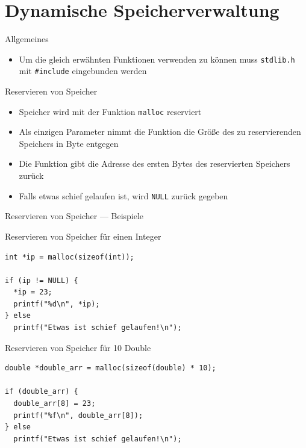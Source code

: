 \documentclass[presentation]{beamer}
\begin{document}
\section{Dynamische Speicherverwaltung}
\label{sec:org6de04c1}
\begin{frame}[label={sec:orgc31dd2b},fragile]{Allgemeines}
 \begin{itemize}
\item Um die gleich erwähnten Funktionen verwenden zu können muss
{\color{solarizedYellow}\texttt{stdlib.h} }mit {\color{solarizedYellow}\texttt{\#include} }eingebunden werden
\end{itemize}
\end{frame}
\begin{frame}[label={sec:org79a0df7},fragile]{Reservieren von Speicher}
 \begin{itemize}
\item Speicher wird mit der Funktion {\color{solarizedYellow}\texttt{malloc} }reserviert
\item Als einzigen Parameter nimmt die Funktion die Größe des zu
reservierenden Speichers in Byte entgegen
\item Die Funktion gibt die Adresse des ersten Bytes des reservierten
Speichers zurück
\item Falls etwas schief gelaufen ist, wird {\color{solarizedYellow}\texttt{NULL} }zurück gegeben
\end{itemize}
\end{frame}
\begin{frame}[label={sec:org399b842},fragile]{Reservieren von Speicher --- Beispiele}
 \begin{block}{Reservieren von Speicher für einen Integer}
\begin{verbatim}
int *ip = malloc(sizeof(int));

if (ip != NULL) {
  *ip = 23;
  printf("%d\n", *ip);
} else
  printf("Etwas ist schief gelaufen!\n");
\end{verbatim}
\end{block}
\begin{block}{Reservieren von Speicher für 10 Double}
\begin{verbatim}
double *double_arr = malloc(sizeof(double) * 10);

if (double_arr) {
  double_arr[8] = 23;
  printf("%f\n", double_arr[8]);
} else
  printf("Etwas ist schief gelaufen!\n");
\end{verbatim}
\end{block}
\end{frame}
\end{document}
